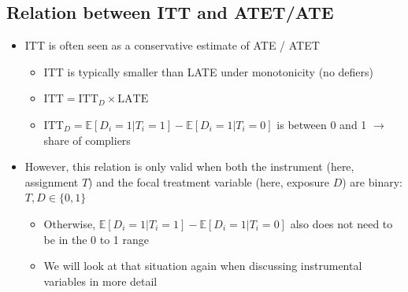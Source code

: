 \documentclass[10pt]{article}
\begin{document}
\subsection{Relation between ITT and ATET/ATE}
\begin{itemize}
    \item ITT is often seen as a conservative estimate of ATE / ATET 
    \begin{itemize}
        \item ITT is typically smaller than LATE under monotonicity (no defiers)
        \item $\text{ITT} = \text{ITT}_D\times\text{LATE} $
        \item $\text{ITT}_D = \mathbb{E}[D_i = 1 | T_i = 1] - \mathbb{E}[D_i = 1 | T_i = 0] $ is between 0 and 1 $\to $ share of compliers
    \end{itemize}
    \item However, this relation is only valid when both the instrument (here, assignment $T $) and the focal treatment variable (here, exposure $D $) are binary: $T, D\in\{0, 1\} $
    \begin{itemize}
        \item Otherwise, $\mathbb{E}[D_i = 1 | T_i = 1] - \mathbb{E}[D_i = 1 | T_i = 0] $ also does not need to be in the 0 to 1 range
        \item We will look at that situation again when discussing instrumental variables in more detail 
    \end{itemize}
\end{itemize}
\end{document}
